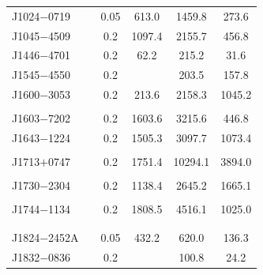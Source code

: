 \begin{table}
\begin{tabular}{lccccc}
J1024$-$0719 & \cite{Xilouris98,Ord04,Yan11a}      & 0.05  &      613.0 	 &    1459.8  	&      273.6    \\  
J1045$-$4509 & \cite{Manchester04,Ord04,Yan11a}    & 0.2   &     1097.4 	 &    2155.7  	&      456.8    \\  
J1446$-$4701 & \cite{Keith12}                     & 0.2   &       62.2 	 &     215.2  	&       31.6    \\
J1545$-$4550 & \cite{Burgay13}                    & 0.2   &             	 &     203.5  	&      157.8    \\
J1600$-$3053 & \cite{Ord04,Yan11a}                 & 0.2   &      213.6 	 &    2158.3  	&     1045.2    \\  
             &                                    &       &               &              &               \\
J1603$-$7202 & \cite{Manchester04,Ord04,Yan11a}    & 0.2   &     1603.6 	 &    3215.6  	&      446.8    \\  
J1643$-$1224 & \cite{Xilouris98,Stairs99}         & 0.2   &     1505.3 	 &    3097.7  	&     1073.4    \\   
             & \cite{Ord04,Yan11a}                 &       &               &              &               \\  
J1713$+$0747 & \cite{Xilouris98,Stairs99}         & 0.2   &     1751.4 	 &   10294.1  	&     3894.0    \\  
             & \cite{Ord04,Yan11a}                 &       &               &              &               \\  
J1730$-$2304 & \cite{Xilouris98,Kramer98}         & 0.2   &     1138.4 	 &    2645.2  	&     1665.1    \\  
             & \cite{Stairs99,Ord04,Yan11a}        &       &               &              &               \\  
J1744$-$1134 & \cite{Xilouris98,Kramer98}         & 0.2   &     1808.5 	 &    4516.1  	&     1025.0    \\  
             & \cite{Stairs99,Ord04,Yan11a}        &       &               &              &               \\  
             &                                    &       &               &              &               \\
J1824$-$2452A& \cite{Ord04,Yan11a,Stairs99}        & 0.05  &      432.2 	 &     620.0  	&      136.3    \\  
J1832$-$0836 & \cite{Burgay13}                    & 0.2   &            	 &     100.8  	&       24.2    \\  

\end{tabular}
\end{table}
